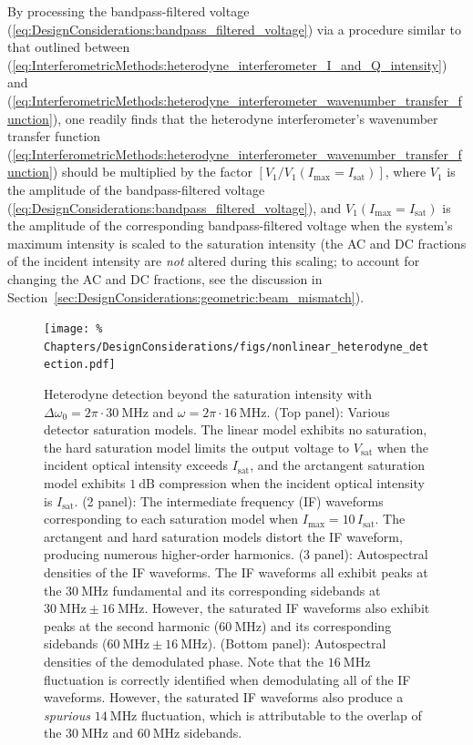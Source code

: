 By processing the bandpass-filtered voltage
(\ref{eq:DesignConsiderations:bandpass_filtered_voltage})
via a procedure similar to that outlined between
(\ref{eq:InterferometricMethods:heterodyne_interferometer_I_and_Q_intensity})
and
(\ref{eq:InterferometricMethods:heterodyne_interferometer_wavenumber_transfer_function}),
one readily finds that
the heterodyne interferometer's wavenumber transfer function
(\ref{eq:InterferometricMethods:heterodyne_interferometer_wavenumber_transfer_function})
should be multiplied by the factor
$[V_1 / V_1(I_{\text{max}} = I_{\text{sat}})]$, where
$V_1$ is the amplitude of the bandpass-filtered voltage
(\ref{eq:DesignConsiderations:bandpass_filtered_voltage}), and
$V_1(I_{\text{max}} = I_{\text{sat}})$
is the amplitude of the corresponding bandpass-filtered voltage
when the system's maximum intensity is scaled to the saturation intensity
(the AC and DC fractions of the incident intensity
are \emph{not} altered during this scaling;
to account for changing the AC and DC fractions, see the discussion in
Section~\ref{sec:DesignConsiderations:geometric:beam_mismatch}).

\begin{figure}
  \centering
  \texttt{[image: \%
    Chapters/DesignConsiderations/figs/nonlinear\_heterodyne\_detection.pdf]}
  \caption[Heterodyne detection beyond the saturation intensity]{%
    Heterodyne detection beyond the saturation intensity with
    $\Delta\omega_0 = 2\pi \cdot \SI{30}{\mega\hertz}$ and
    $\omega = 2 \pi \cdot \SI{16}{\mega\hertz}$.
    (Top panel): Various detector saturation models.
    The linear model exhibits no saturation,
    the hard saturation model limits the output voltage
    to $V_{\text{sat}}$ when the incident optical intensity
    exceeds $I_{\text{sat}}$, and
    the arctangent saturation model exhibits $\SI{1}{\deci\bel}$ compression
    when the incident optical intensity is $I_{\text{sat}}$.
    (2 panel): The intermediate frequency (IF) waveforms
    corresponding to each saturation model when
    $I_{\text{max}} = 10 \, I_{\text{sat}}$.
    The arctangent and hard saturation models distort the IF waveform,
    producing numerous higher-order harmonics.
    (3 panel): Autospectral densities of the IF waveforms.
    The IF waveforms all exhibit peaks at
    the $\SI{30}{\mega\hertz}$ fundamental and
    its corresponding sidebands at
    $\SI{30}{\mega\hertz} \pm \SI{16}{\mega\hertz}$.
    However, the saturated IF waveforms
    also exhibit peaks at the second harmonic ($\SI{60}{\mega\hertz}$)
    and its corresponding sidebands
    ($\SI{60}{\mega\hertz} \pm \SI{16}{\mega\hertz}$).
    (Bottom panel): Autospectral densities of the demodulated phase.
    Note that the $\SI{16}{\mega\hertz}$ fluctuation is correctly identified
    when demodulating all of the IF waveforms.
    However, the saturated IF waveforms also produce
    a \emph{spurious} $\SI{14}{\mega\hertz}$ fluctuation,
    which is attributable to the overlap of
    the $\SI{30}{\mega\hertz}$ and $\SI{60}{\mega\hertz}$ sidebands.
  }
\label{fig:DesignConsiderations:nonlinear_heterodyne_detection}
\end{figure}


